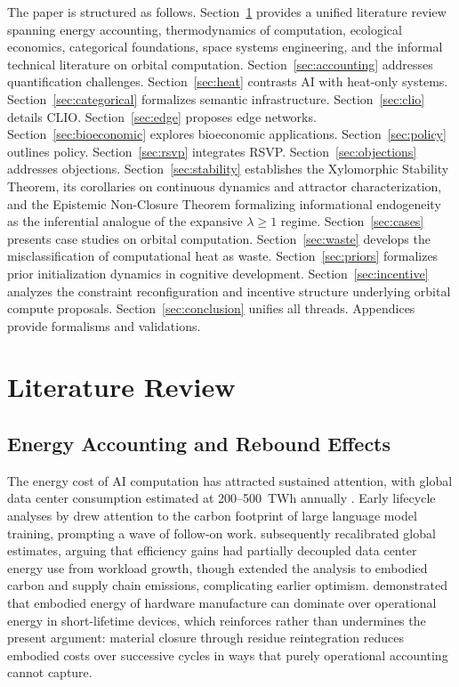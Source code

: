 \documentclass[11pt,a4paper]{article}
\theoremstyle{plain}
\theoremstyle{definition}
\theoremstyle{remark}
\begin{document}
The paper is structured as follows. Section~\ref{sec:lit} provides a unified
literature review spanning energy accounting, thermodynamics of computation,
ecological economics, categorical foundations, space systems engineering, and
the informal technical literature on orbital computation.
Section~\ref{sec:accounting} addresses quantification challenges.
Section~\ref{sec:heat} contrasts AI with heat-only systems.
Section~\ref{sec:categorical} formalizes semantic infrastructure.
Section~\ref{sec:clio} details CLIO\@. Section~\ref{sec:edge} proposes edge
networks. Section~\ref{sec:bioeconomic} explores bioeconomic applications.
Section~\ref{sec:policy} outlines policy. Section~\ref{sec:rsvp} integrates
RSVP\@. Section~\ref{sec:objections} addresses objections.
Section~\ref{sec:stability} establishes the Xylomorphic Stability Theorem, its
corollaries on continuous dynamics and attractor characterization, and the
Epistemic Non-Closure Theorem formalizing informational endogeneity as the
inferential analogue of the expansive $\lambda \geq 1$ regime.
Section~\ref{sec:cases} presents case studies on orbital computation.
Section~\ref{sec:waste} develops the misclassification of computational heat as
waste. Section~\ref{sec:priors} formalizes prior initialization dynamics in
cognitive development. Section~\ref{sec:incentive} analyzes the constraint
reconfiguration and incentive structure underlying orbital compute proposals.
Section~\ref{sec:conclusion} unifies all threads. Appendices provide formalisms
and validations.

\section{Literature Review}
\label{sec:lit}

\subsection{Energy Accounting and Rebound Effects}

The energy cost of AI computation has attracted sustained attention, with
global data center consumption estimated at 200--500~TWh annually
\citep{shehabi2016,iea2023,iea2024}. Early lifecycle analyses by
\citet{strubell2019} drew attention to the carbon footprint of large language
model training, prompting a wave of follow-on work. \citet{masanet2020}
subsequently recalibrated global estimates, arguing that efficiency gains had
partially decoupled data center energy use from workload growth, though
\citet{gao2022} extended the analysis to embodied carbon and supply chain
emissions, complicating earlier optimism. \citet{horner2014} demonstrated that
embodied energy of hardware manufacture can dominate over operational energy in
short-lifetime devices, which reinforces rather than undermines the present
argument: material closure through residue reintegration reduces embodied costs
over successive cycles in ways that purely operational accounting cannot capture.
\end{document}
